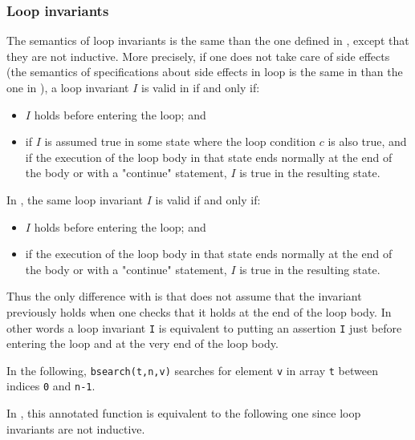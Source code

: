 
\subsubsection{Loop invariants}

 The semantics of loop invariants is the same than the one
defined in \acsl, except that they are not inductive. More precisely, if one
does not take care of side effects (the semantics of specifications about side
effects in loop is the same in \eacsl than the one in \acsl), a loop invariant
$I$ is valid in \acsl if and only if:
\begin{itemize}
\item $I$ holds before entering the loop; and
\item if $I$ is assumed true in some state where the loop condition $c$ is also
  true, and if the execution of the loop body in that state ends normally at the
  end of the body or with a "continue" statement, $I$ is true in the resulting
  state.
\end{itemize}

In \eacsl, the same loop invariant $I$ is valid if and only if:
\begin{itemize}
\item $I$ holds before entering the loop; and
\item if the execution of the loop body in that state ends normally at the end
  of the body or with a "continue" statement, $I$ is true in the resulting
  state.
\end{itemize}

Thus the only difference with \acsl is that \eacsl does not assume that the
invariant previously holds when one checks that it holds at the end of the loop
body. In other words a loop invariant \lstinline|I| is equivalent to putting an
assertion \lstinline|I| just before entering the loop and at the very end of the
loop body.

\begin{example}
In the following, \lstinline|bsearch(t,n,v)| searches for element \lstinline|v|
in array \lstinline|t| between indices \lstinline|0| and \lstinline|n-1|.


In \eacsl, this annotated function is equivalent to the following one since
loop invariants are not inductive.


\end{example}

